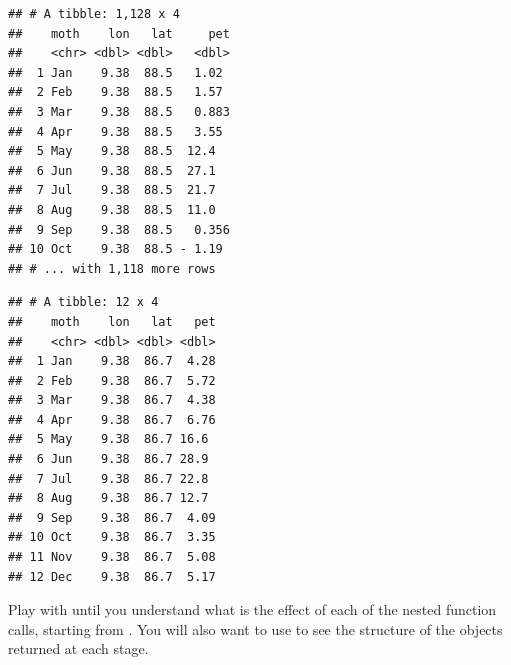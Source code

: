 \documentclass[krantz2,ChapterTOCs]{krantz}\usepackage{knitr}
\begin{document}
\begin{knitrout}\footnotesize
{}\color{fgcolor}\begin{kframe}
\begin{alltt}
 \hlkwb{<-}
    \hlstd{(} \hlstd{=} \hlstd{(month.abb[}\hlopt{:}\hlstd{],} 
            \hlstd{= longitude[}\hlstd{],}
            \hlstd{=}   \hlstd{=} \hlstd{),}
            \hlstd{=} \hlstd{(}\hlstd{(} \hlstd{)[}\hlstd{, , ]))}
           \hlstd{)}
\end{alltt}
\begin{verbatim}
## # A tibble: 1,128 x 4
##    moth    lon   lat     pet
##    <chr> <dbl> <dbl>   <dbl>
##  1 Jan    9.38  88.5   1.02 
##  2 Feb    9.38  88.5   1.57 
##  3 Mar    9.38  88.5   0.883
##  4 Apr    9.38  88.5   3.55 
##  5 May    9.38  88.5  12.4  
##  6 Jun    9.38  88.5  27.1  
##  7 Jul    9.38  88.5  21.7  
##  8 Aug    9.38  88.5  11.0  
##  9 Sep    9.38  88.5   0.356
## 10 Oct    9.38  88.5 - 1.19 
## # ... with 1,118 more rows
\end{verbatim}
\begin{alltt}
 \hlopt{==} \hlstd{latitude[}\hlstd{])}
\end{alltt}
\begin{verbatim}
## # A tibble: 12 x 4
##    moth    lon   lat   pet
##    <chr> <dbl> <dbl> <dbl>
##  1 Jan    9.38  86.7  4.28
##  2 Feb    9.38  86.7  5.72
##  3 Mar    9.38  86.7  4.38
##  4 Apr    9.38  86.7  6.76
##  5 May    9.38  86.7 16.6 
##  6 Jun    9.38  86.7 28.9 
##  7 Jul    9.38  86.7 22.8 
##  8 Aug    9.38  86.7 12.7 
##  9 Sep    9.38  86.7  4.09
## 10 Oct    9.38  86.7  3.35
## 11 Nov    9.38  86.7  5.08
## 12 Dec    9.38  86.7  5.17
\end{verbatim}
\end{kframe}
\end{knitrout}

\begin{playground}
Play with  until you understand what is the effect of each of the nested function calls, starting from . You will also want to use  to see the structure of the objects returned at each stage.
\end{playground}
\end{document}
